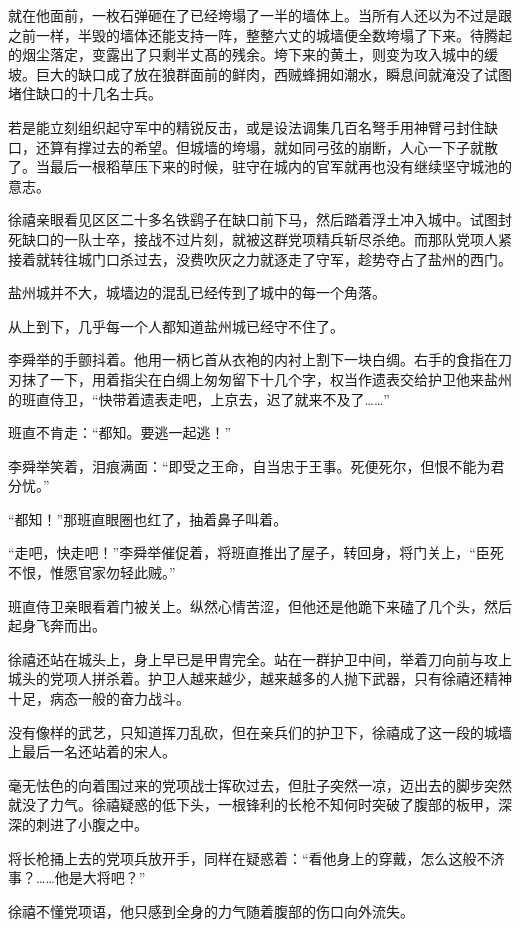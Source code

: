 就在他面前，一枚石弹砸在了已经垮塌了一半的墙体上。当所有人还以为不过是跟之前一样，半毁的墙体还能支持一阵，整整六丈的城墙便全数垮塌了下来。待腾起的烟尘落定，变露出了只剩半丈髙的残余。垮下来的黄土，则变为攻入城中的缓坡。巨大的缺口成了放在狼群面前的鲜肉，西贼蜂拥如潮水，瞬息间就淹没了试图堵住缺口的十几名士兵。

若是能立刻组织起守军中的精锐反击，或是设法调集几百名弩手用神臂弓封住缺口，还算有撑过去的希望。但城墙的垮塌，就如同弓弦的崩断，人心一下子就散了。当最后一根稻草压下来的时候，驻守在城内的官军就再也没有继续坚守城池的意志。

徐禧亲眼看见区区二十多名铁鹞子在缺口前下马，然后踏着浮土冲入城中。试图封死缺口的一队士卒，接战不过片刻，就被这群党项精兵斩尽杀绝。而那队党项人紧接着就转往城门口杀过去，没费吹灰之力就逐走了守军，趁势夺占了盐州的西门。

盐州城并不大，城墙边的混乱已经传到了城中的每一个角落。

从上到下，几乎每一个人都知道盐州城已经守不住了。

李舜举的手颤抖着。他用一柄匕首从衣袍的内衬上割下一块白绸。右手的食指在刀刃抹了一下，用着指尖在白绸上匆匆留下十几个字，权当作遗表交给护卫他来盐州的班直侍卫，“快带着遗表走吧，上京去，迟了就来不及了……”

班直不肯走：“都知。要逃一起逃！”

李舜举笑着，泪痕满面：“即受之王命，自当忠于王事。死便死尔，但恨不能为君分忧。”

“都知！”那班直眼圈也红了，抽着鼻子叫着。

“走吧，快走吧！”李舜举催促着，将班直推出了屋子，转回身，将门关上，“臣死不恨，惟愿官家勿轻此贼。”

班直侍卫亲眼看着门被关上。纵然心情苦涩，但他还是他跪下来磕了几个头，然后起身飞奔而出。

徐禧还站在城头上，身上早已是甲胄完全。站在一群护卫中间，举着刀向前与攻上城头的党项人拼杀着。护卫人越来越少，越来越多的人抛下武器，只有徐禧还精神十足，病态一般的奋力战斗。

没有像样的武艺，只知道挥刀乱砍，但在亲兵们的护卫下，徐禧成了这一段的城墙上最后一名还站着的宋人。

毫无怯色的向着围过来的党项战士挥砍过去，但肚子突然一凉，迈出去的脚步突然就没了力气。徐禧疑惑的低下头，一根锋利的长枪不知何时突破了腹部的板甲，深深的刺进了小腹之中。

将长枪捅上去的党项兵放开手，同样在疑惑着：“看他身上的穿戴，怎么这般不济事？……他是大将吧？”

徐禧不懂党项语，他只感到全身的力气随着腹部的伤口向外流失。

